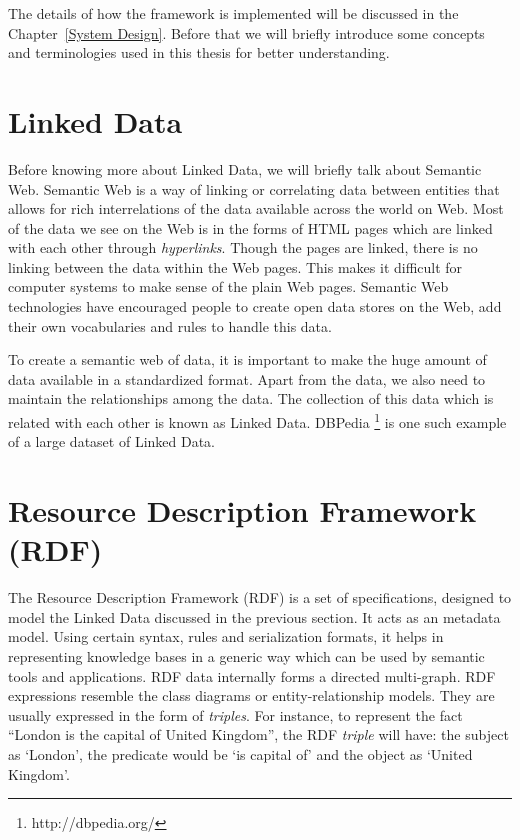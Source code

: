 The details of how the framework is implemented will be discussed in the Chapter~\ref{System Design}. Before that we will briefly introduce some concepts and terminologies used in this thesis for better understanding.

\section{Linked Data}

Before knowing more about Linked Data, we will briefly talk about Semantic Web. Semantic Web is a way of linking or correlating data between entities that allows for rich interrelations of the data available across the world on Web. Most of the data we see on the Web is in the forms of HTML pages which are linked with each other through \textit{hyperlinks}. Though the pages are linked, there is no linking between the data within the Web pages. This makes it difficult for computer systems to make sense of the plain Web pages. Semantic Web technologies have encouraged people to create open data stores on the Web, add their own vocabularies and rules to handle this data.

To create a semantic web of data, it is important to make the huge amount of data available in a standardized format. Apart from the data, we also need to maintain the relationships among the data. The collection of this data which is related with each other is known as Linked Data. DBPedia \footnote{http://dbpedia.org/} is one such example of a large dataset of Linked Data.

\section{Resource Description Framework (RDF)}

The Resource Description Framework (RDF) is a set of specifications, designed to model the Linked Data discussed in the previous section. It acts as an metadata model. Using certain syntax, rules and serialization formats, it helps in representing knowledge bases in a generic way which can be used by semantic tools and applications. RDF data internally forms a directed multi-graph. RDF expressions resemble the class diagrams or entity-relationship models. They are usually expressed in the form of \textit{triples}. For instance, to represent the fact ``London is the capital of United Kingdom'', the RDF \textit{triple} will have: the subject as `London', the predicate would be `is capital of' and the object as `United Kingdom'.

